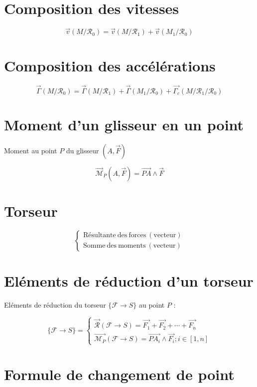 \documentclass[a4paper, 11pt]{article}
\newcommand{\V}{\overrightarrow}
\newcommand{\R}{\mathcal{R}}
\newcommand{\F}{\mathcal{F}}
\newcommand{\M}{\mathcal{M}}
\begin{document}
\section{Composition des vitesses} %

$$\V{v}(M/\R_0) = \V{v}(M/\R_1) + \V{v}(M_1/\R_0)$$

\section{Composition des accélérations} %

$$\V{\Gamma}(M/\R_0) = \V{\Gamma}(M/\R_1) + \V{\Gamma}(M_1/\R_0) +\V{\Gamma_c}(M/\R_1/\R_0)$$


\section{Moment d'un glisseur en un point} %

Moment au point $P$ du glisseur $(A,\V{F})$

$$\V{\M}_P(A,\V{F}) = \V{PA} \wedge \V{F}$$

\section{Torseur} %

$$
\left\{
    \begin{array}{l}
        \mathrm{Résultante~des~forces~(vecteur)}\\
        \mathrm{Somme~des~moments~(vecteur)}
    \end{array}
\right.
$$

\section{Eléments de réduction d'un torseur} %

Eléments de réduction du torseur $\{\F\rightarrow S\}$ au point $P$ :

$$
\{\F\rightarrow S\} = \left\{
    \begin{array}{l}
    \V{\R}(\F\rightarrow S) = \V{F_1} + \V{F_2} + \cdots + \V{F_n}\\
    \V{\M_P}(\F\rightarrow S) = \V{PA_i} \wedge \V{F_i} ; i \in [1, n]
    \end{array}
\right.
$$

\section{Formule de changement de point} %
\end{document}
